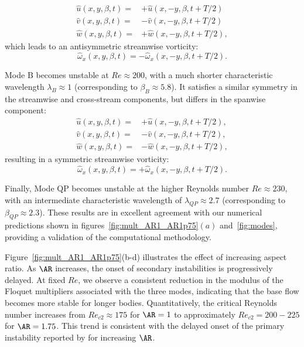 %
\begin{equation}
\begin{aligned}
\hat{u}(x,y,\beta,t) = &+ \hat{u}(x,-y,\beta,t+T/2) \nonumber \\
\hat{v}(x,y,\beta,t) = &-\hat{v}(x,-y,\beta,t+T/2) \nonumber \\
\hat{w}(x,y,\beta,t) = &+ \hat{w}(x,-y,\beta,t+T/2),
\end{aligned}
\end{equation}
%
which leads to an antisymmetric streamwise vorticity:
%
\begin{equation}
\hat{\omega}_x(x,y,\beta,t) = -\hat{\omega}_x(x,-y,\beta,t+T/2).
\end{equation}

Mode B becomes unstable at $Re \approx 200$, with a much shorter characteristic wavelength $\lambda_B \approx 1$ (corresponding to $\beta_B \approx 5.8$). It satisfies a similar symmetry in the streamwise and cross-stream components, but differs in the spanwise component:
%
\begin{equation}
\begin{aligned}
\hat{u}(x,y,\beta,t) = &+\hat{u}(x,-y,\beta,t+T/2), \nonumber \\
\hat{v}(x,y,\beta,t) = &-\hat{v}(x,-y,\beta,t+T/2), \nonumber \\
\hat{w}(x,y,\beta,t) = &-\hat{w}(x,-y,\beta,t+T/2),
\end{aligned}
\end{equation}
%
resulting in a symmetric streamwise vorticity:
%
\begin{equation}
\hat{\omega}_x(x,y,\beta,t) = +\hat{\omega}_x(x,-y,\beta,t+T/2).
\end{equation}

Finally, Mode QP becomes unstable at the higher Reynolds number $Re \approx 230$, with an intermediate characteristic wavelength of $\lambda_{QP} \approx 2.7$ (corresponding to $\beta_{QP} \approx 2.3$).
%
These results are in excellent agreement with our numerical predictions shown in figures~\ref{fig:mult_AR1_AR1p75}$(a)$ and~\ref{fig:modes}, providing a validation of the computational methodology.

Figure~\ref{fig:mult_AR1_AR1p75}(b-d) illustrates the effect of increasing aspect ratio. As $\AR$ increases, the onset of secondary instabilities is progressively delayed. At fixed $Re$, we observe a consistent reduction in the modulus of the Floquet multipliers associated with the three modes, indicating that the base flow becomes more stable for longer bodies. Quantitatively, the critical Reynolds number increases from $Re_{c2} \approx 175$ for $\AR=1$ to approximately $Re_{c2} = 200-225$ for $\AR=1.75$. This trend is consistent with the delayed onset of the primary instability reported by \citet{chiarini-quadrio-auteri-2021} for increasing $\AR$.

